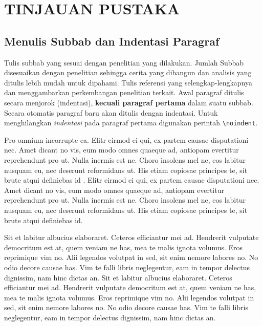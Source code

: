 \chapter{TINJAUAN PUSTAKA}


\section{Menulis Subbab dan Indentasi Paragraf}
\noindent Tulis subbab yang sesuai dengan penelitian yang dilakukan. Jumlah Subbab disesuaikan dengan penelitian sehingga cerita yang dibangun dan analisis yang ditulis lebih mudah untuk dipahami. Tulis referensi yang selengkap-lengkapnya dan menggambarkan perkembangan penelitian terkait. Awal paragraf ditulis secara menjorok (indentasi), \textbf{kecuali paragraf pertama} dalam suatu subbab. Secara otomatis paragraf baru akan ditulis dengan indentasi. Untuk menghilangkan \textit{indentasi} pada paragraf pertama digunakan perintah \verb!\noindent!.

Pro omnium incorrupte ea. Elitr eirmod ei qui, ex partem causae disputationi nec. Amet dicant no vis, eum modo omnes quaeque ad, antiopam evertitur reprehendunt pro ut. Nulla inermis est ne. Choro insolens mel ne, eos labitur nusquam eu, nec deserunt reformidans ut. His etiam copiosae principes te, sit brute atqui definiebas id \cite{mumpuni_future_2018}. Elitr eirmod ei qui, ex partem causae disputationi nec. Amet dicant no vis, eum modo omnes quaeque ad, antiopam evertitur reprehendunt pro ut. Nulla inermis est ne. Choro insolens mel ne, eos labitur nusquam eu, nec deserunt reformidans ut. His etiam copiosae principes te, sit brute atqui definiebas id.

Sit et labitur albucius elaboraret. Ceteros efficiantur mei ad. Hendrerit vulputate democritum est at, quem veniam ne has, mea te malis ignota volumus. Eros reprimique vim no. Alii legendos volutpat in sed, sit enim nemore labores no. No odio decore causae has. Vim te falli libris neglegentur, eam in tempor delectus dignissim, nam hinc dictas an. Sit et labitur albucius elaboraret. Ceteros efficiantur mei ad. Hendrerit vulputate democritum est at, quem veniam ne has, mea te malis ignota volumus. Eros reprimique vim no. Alii legendos volutpat in sed, sit enim nemore labores no. No odio decore causae has. Vim te falli libris neglegentur, eam in tempor delectus dignissim, nam hinc dictas an.

